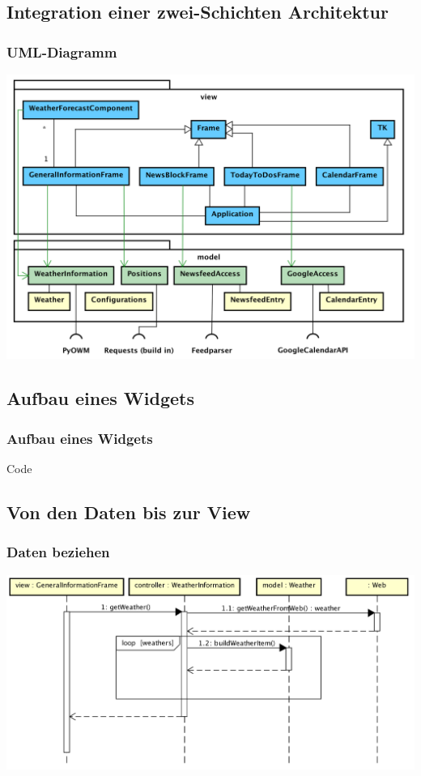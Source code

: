 \documentclass[11pt]{beamer}
\begin{document}
	\subsection{Integration einer zwei-Schichten Architektur}
	\begin{frame}
		\frametitle{UML-Diagramm}
		\begin{center}
			\includegraphics[height=.7\paperheight]{images/umlDiagram}
		\end{center}
	\end{frame}

	\subsection{Aufbau eines Widgets}
\begin{frame}[fragile]
	\frametitle{Aufbau eines Widgets}
		
\begin{block}{Code}

\end{block}
\end{frame}

	\subsection{Von den Daten bis zur View}
	\begin{frame}
		\frametitle{Daten beziehen}
		\begin{center}
			\includegraphics[height=.55\paperheight]{images/sequenceDiagramGettingData}
		\end{center}
	\end{frame}
\end{document}
